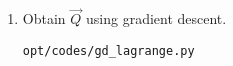 \begin{enumerate}[label=\thesection.\arabic*.,ref=\thesection.\theenumi]
%	
\item Obtain $\vec{Q}$ using gradient descent.
\\
\solution
\begin{lstlisting}
opt/codes/gd_lagrange.py
\end{lstlisting}

\end{enumerate}

